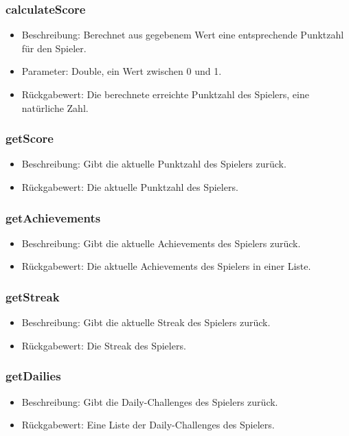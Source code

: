 \documentclass[a4paper]{scrreprt}
\begin{document}
   \subsubsection{calculateScore}
    \begin{itemize}
   	\item Beschreibung: Berechnet aus gegebenem Wert eine entsprechende Punktzahl für den Spieler.
   	\item Parameter: Double, ein Wert zwischen 0 und 1. 
   	\item Rückgabewert: Die berechnete erreichte Punktzahl des Spielers, eine natürliche Zahl.
   \end{itemize}
   \subsubsection{getScore}
   \begin{itemize}
   \item Beschreibung: Gibt die aktuelle Punktzahl des Spielers zurück.
   \item Rückgabewert: Die aktuelle Punktzahl des Spielers.
\end{itemize}
   \subsubsection{getAchievements}
   \begin{itemize}
   \item Beschreibung: Gibt die aktuelle Achievements des Spielers zurück.
   \item Rückgabewert: Die aktuelle Achievements des Spielers in einer Liste.
\end{itemize}
   \subsubsection{getStreak}
   \begin{itemize}
   \item Beschreibung: Gibt die aktuelle Streak des Spielers zurück.
   \item Rückgabewert: Die Streak des Spielers.
\end{itemize}
   \subsubsection{getDailies}
   \begin{itemize}
   \item Beschreibung: Gibt die Daily-Challenges des Spielers zurück.
   \item Rückgabewert: Eine Liste der Daily-Challenges des Spielers.
  \end{itemize}
\end{document}

